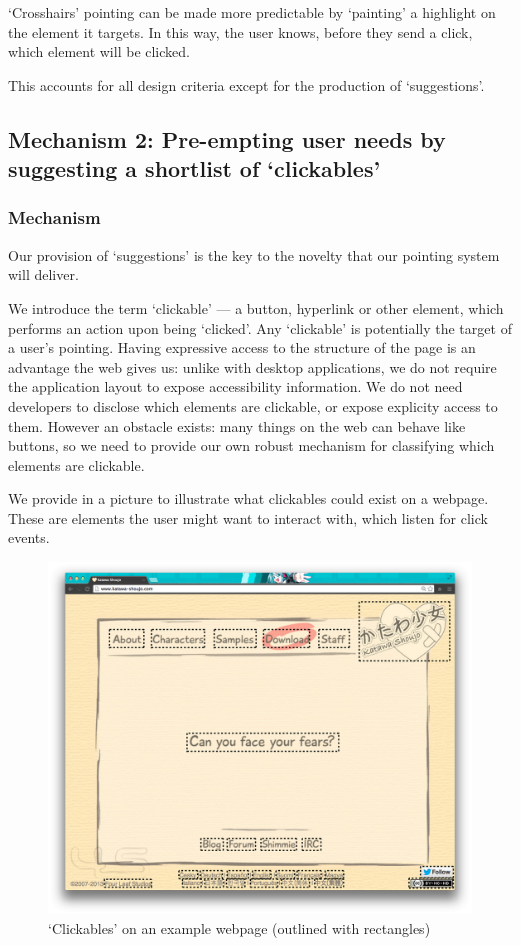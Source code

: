 \documentclass[11pt,openright,a4paper]{report}
\begin{document}
`Crosshairs' pointing can be made more predictable by `painting' a highlight on the element it targets. In this way, the user knows, before they send a click, which element will be clicked.

This accounts for all design criteria except for the production of `suggestions'.
\subsection{Mechanism 2: Pre-empting user needs by suggesting a shortlist of `clickables'}
\subsubsection{Mechanism}
Our provision of `suggestions' is the key to the novelty that our pointing system will deliver.

\label{sec:clickablesExplained}
We introduce the term `clickable' --- a button, hyperlink or other element, which performs an action upon being `clicked'. Any `clickable' is potentially the target of a user's pointing. Having expressive access to the structure of the page is an advantage the web gives us: unlike with desktop applications, we do not require the application layout to expose accessibility information. We do not need developers to disclose which elements are clickable, or expose explicity access to them. However an obstacle exists: many things on the web can behave like buttons, so we need to provide our own robust mechanism for classifying which elements are clickable.

We provide in  a picture to illustrate what clickables could exist on a webpage. These are elements the user might want to interact with, which listen for click events.
\begin{figure}[ht]
\centering\includegraphics[width=\textwidth]{figures/Clickables.png}
\caption{`Clickables' on an example webpage (outlined with rectangles)}
\label{fig:clickables}
\end{figure}
\end{document}
